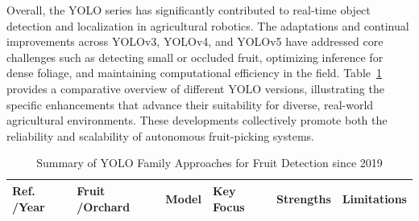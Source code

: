 \documentclass[a4paper,fleqn]{cas-dc}
\begin{document}
Overall, the YOLO series has significantly contributed to real-time object detection and localization in agricultural robotics. The adaptations and continual improvements across YOLOv3, YOLOv4, and YOLOv5 have addressed core challenges such as detecting small or occluded fruit, optimizing inference for dense foliage, and maintaining computational efficiency in the field. Table~\ref{tab:yolo-based} provides a comparative overview of different YOLO versions, illustrating the specific enhancements that advance their suitability for diverse, real-world agricultural environments. These developments collectively promote both the reliability and scalability of autonomous fruit-picking systems.


\begin{table}[htbp]
	\centering
	\small
	\caption{Summary of YOLO Family Approaches for Fruit Detection since 2019} 
	\label{tab:yolo-based}
	\begin{tabular}{@{}p{}p{}p{}p{}p{}p{}@{}}
	\toprule
	\textbf{Ref. \newline /Year} & \textbf{Fruit \newline /Orchard} & \textbf{Model} & \textbf{Key Focus} & \textbf{Strengths} & \textbf{Limitations} \\ \midrule
	

\end{tabular}
\end{table}
\end{document}
